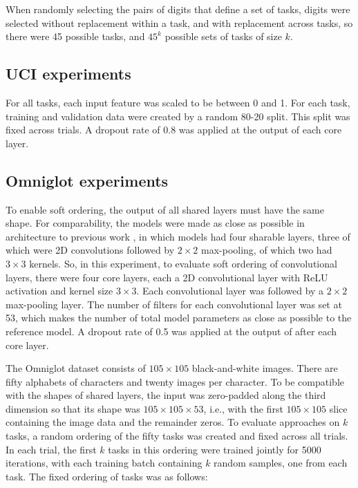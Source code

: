 \documentclass{article}
\theoremstyle{definition}
\theoremstyle{remark}
\begin{document}
When randomly selecting the pairs of digits that define a set of tasks, digits were selected without replacement within a task, and with replacement across tasks, so there were 45 possible tasks, and $45^k$ possible sets of tasks of size $k$.


\subsection{UCI experiments} \label{app:uci}

For all tasks, each input feature was scaled to be between 0 and 1.
For each task, training and validation data were created by a random 80-20 split. 
This split was fixed across trials.
A dropout rate of 0.8 was applied at the output of each core layer.


\subsection{Omniglot experiments} \label{app:omni}

To enable soft ordering, the output of all shared layers must have the same shape.
For comparability, the models were made as close as possible in architecture to previous work \citep{Yang:2017}, in which models had four sharable layers, three of which were 2D convolutions followed by $2 \times 2$ max-pooling, of which two had $3 \times 3$ kernels.
So, in this experiment, to evaluate soft ordering of convolutional layers, there were four core layers, each a 2D convolutional layer with ReLU activation and kernel size $3 \times 3$.
Each convolutional layer was followed by a $2 \times 2$ max-pooling layer.
The number of filters for each convolutional layer was set at 53, which makes the number of total model parameters as close as possible to the reference model.
A dropout rate of 0.5 was applied at the output of after each core layer.

The Omniglot dataset consists of $105\times105$ black-and-white images.
There are fifty alphabets of characters and twenty images per character.
To be compatible with the shapes of shared layers, the input was zero-padded along the third dimension so that its shape was $105\times105\times53$, i.e., with the first $105\times105$ slice containing the image data and the remainder zeros.
To evaluate approaches on $k$ tasks, a random ordering of the fifty tasks was created and fixed across all trials.
In each trial, the first $k$ tasks in this ordering were trained jointly for 5000 iterations, with each training batch containing $k$ random samples, one from each task.
The fixed ordering of tasks was as follows:
\end{document}
